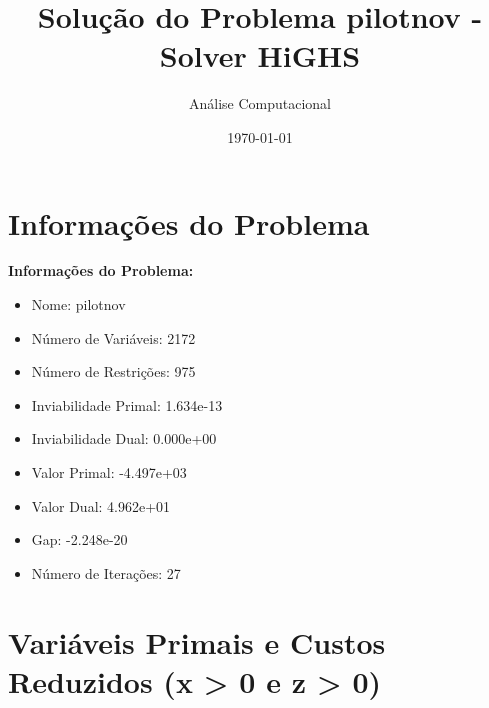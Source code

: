 \documentclass[12pt]{article}
\title{Solução do Problema pilotnov - Solver HiGHS}
\author{Análise Computacional}
\date{\today}
\begin{document}
\maketitle

\section{Informações do Problema}

\textbf{Informações do Problema:}
\begin{itemize}
\item Nome: pilotnov
\item Número de Variáveis: 2172
\item Número de Restrições: 975
\item Inviabilidade Primal: 1.634e-13
\item Inviabilidade Dual: 0.000e+00
\item Valor Primal: -4.497e+03
\item Valor Dual: 4.962e+01
\item Gap: -2.248e-20
\item Número de Iterações: 27
\end{itemize}


\section{Variáveis Primais e Custos Reduzidos (x > 0 e z > 0)}
\end{document}
